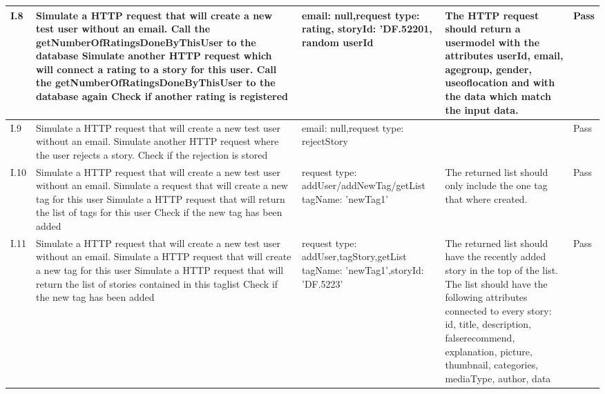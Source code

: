 \begin{appendices}
\begin{center}
\begin{longtable}{ | p{1cm} | p{5.5cm} | p{4cm} | p{4.5cm} | p{2cm}|}
		I.8 & Simulate a HTTP request that will create a new test user without an email. \newline Call the getNumberOfRatingsDoneByThisUser to the database \newline  Simulate another HTTP request which will connect a rating to a story for this user.  \newline Call the getNumberOfRatingsDoneByThisUser to the database again \newline Check if another rating is registered & email: null,\newline request type: rating, storyId: 'DF.52201, random userId  & The HTTP request should return a usermodel with the attributes userId, email, age\textunderscore group, gender, use\textunderscore of\textunderscore location and with the data which match the input data. & Pass \\ \hline
		
		I.9 & Simulate a HTTP request that will create a new test user without an email. \newline  \newline  Simulate another HTTP request where the user rejects a story.  \newline  \newline Check if the rejection is stored & email: null,\newline request type: rejectStory  &  & Pass \\ \hline
		
		I.10 & Simulate a HTTP request that will create a new test user without an email. \newline  Simulate a  request that will create a new tag for this user \newline Simulate a HTTP request that will return the list of tags for this user \newline Check if the new tag has been added  & request type: addUser/addNewTag/getList  tagName: 'newTag1' & The returned list should only include the one tag that where created.& Pass\\ \hline
		
		I.11 & Simulate a HTTP request that will create a new test user without an email. \newline  Simulate a HTTP request that will create a new tag for this user \newline Simulate a HTTP request that will return the list of stories contained in this taglist \newline Check if the new tag has been added  & request type: addUser,tagStory,getList \newline tagName: 'newTag1',\newline storyId: 'DF.5223' & The returned list should have the recently added story in the top of the list. The list should have the following attributes connected to every story: id, title, description, false\textunderscore recommend, explanation, picture, thumbnail, categories, mediaType, author, data  & Pass\\ \hline
		

\end{longtable}
\end{center}
\end{appendices}
